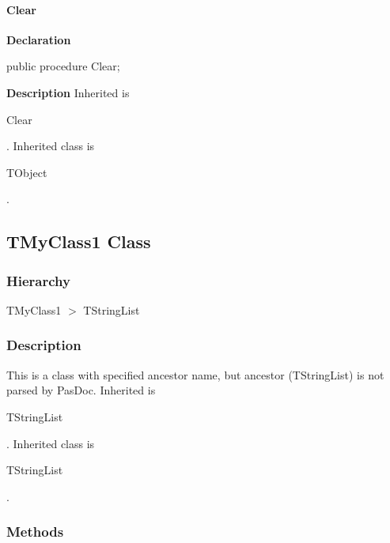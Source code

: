 \documentclass{report}
\newif\ifpdf
\begin{document}
\paragraph*{Clear}\hspace*{\fill}

\label{warning_inherited_test.TMyClass0-Clear}
\begin{list}{}{
\setlength{\itemindent}{0cm}
\setlength{\listparindent}{0cm}
\setlength{\leftmargin}{\evensidemargin}
\addtolength{\leftmargin}{\tmplength}
\settowidth{\labelsep}{X}
\addtolength{\leftmargin}{\labelsep}
\setlength{\labelwidth}{\tmplength}
}
\item[\textbf{Declaration}\hfill]
\ifpdf
\begin{flushleft}
\fi
\begin{ttfamily}
public procedure Clear;\end{ttfamily}

\ifpdf
\end{flushleft}
\fi

\par
\item[\textbf{Description}]
Inherited is \begin{ttfamily}Clear\end{ttfamily}. Inherited class is \begin{ttfamily}TObject\end{ttfamily}.

\end{list}
\ifpdf
\subsection*{\large{\textbf{TMyClass1 Class}}\normalsize\hspace{1ex}\hrulefill}
\else
\subsection*{TMyClass1 Class}
\fi
\label{warning_inherited_test.TMyClass1}
\subsubsection*{\large{\textbf{Hierarchy}}\normalsize\hspace{1ex}\hfill}
TMyClass1 {$>$} TStringList
\subsubsection*{\large{\textbf{Description}}\normalsize\hspace{1ex}\hfill}
This is a class with specified ancestor name, but ancestor (TStringList) is not parsed by PasDoc. Inherited is \begin{ttfamily}TStringList\end{ttfamily}. Inherited class is \begin{ttfamily}TStringList\end{ttfamily}.\subsubsection*{\large{\textbf{Methods}}\normalsize\hspace{1ex}\hfill}
\end{document}

